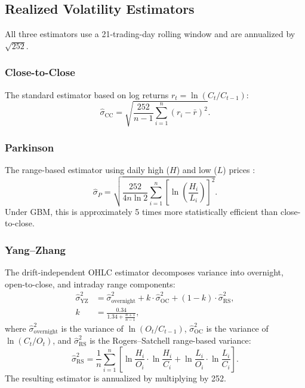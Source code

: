 \documentclass[12pt, letterpaper]{article}
\begin{document}
\subsection{Realized Volatility Estimators}
\label{sec:rv_estimators}

All three estimators use a 21-trading-day rolling window and are annualized by $\sqrt{252}$.

\subsubsection{Close-to-Close}

The standard estimator based on log returns $r_t = \ln(C_t / C_{t-1})$:
\begin{equation}
    \hat{\sigma}_{\text{CC}} = \sqrt{\frac{252}{n-1} \sum_{i=1}^{n} (r_i - \bar{r})^2}.
    \label{eq:rv_cc}
\end{equation}

\subsubsection{Parkinson}

The range-based estimator using daily high ($H$) and low ($L$) prices \citep{Parkinson1980}:
\begin{equation}
    \hat{\sigma}_P = \sqrt{\frac{252}{4n\ln 2} \sum_{i=1}^{n} \left[\ln\left(\frac{H_i}{L_i}\right)\right]^2}.
    \label{eq:rv_park}
\end{equation}
Under GBM, this is approximately 5 times more statistically efficient than close-to-close.

\subsubsection{Yang--Zhang}

The drift-independent OHLC estimator \citep{Yang2000} decomposes variance into overnight, open-to-close, and intraday range components:
\begin{align}
    \hat{\sigma}_{\text{YZ}}^2 &= \hat{\sigma}_{\text{overnight}}^2 + k \cdot \hat{\sigma}_{\text{OC}}^2 + (1 - k) \cdot \hat{\sigma}_{\text{RS}}^2, \label{eq:rv_yz} \\
    k &= \frac{0.34}{1.34 + \frac{n + 1}{n - 1}}, \nonumber
\end{align}
where $\hat{\sigma}_{\text{overnight}}^2$ is the variance of $\ln(O_t / C_{t-1})$, $\hat{\sigma}_{\text{OC}}^2$ is the variance of $\ln(C_t / O_t)$, and $\hat{\sigma}_{\text{RS}}^2$ is the Rogers--Satchell range-based variance:
\begin{equation}
    \hat{\sigma}_{\text{RS}}^2 = \frac{1}{n}\sum_{i=1}^{n}\left[\ln\frac{H_i}{O_i}\cdot\ln\frac{H_i}{C_i} + \ln\frac{L_i}{O_i}\cdot\ln\frac{L_i}{C_i}\right].
    \label{eq:rogers_satchell}
\end{equation}
The resulting estimator is annualized by multiplying by 252.
\end{document}
